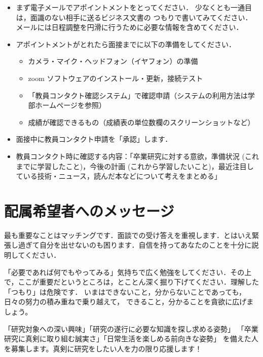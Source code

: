 \documentclass[uplatex,jis2004,a4paper,11pt]{jsarticle}
\begin{document}
\begin{itemize}
  \item まず電子メールでアポイントメントをとってください．
    少なくとも一通目は，面識のない相手に送るビジネス文書の
    つもりで書いてみてください．
    メールには日程調整を円滑に行うために必要な情報を含めてください．
  \item アポイントメントがとれたら面接までに以下の準備をしてください．
    \begin{itemize}
      \item カメラ・マイク・ヘッドフォン（イヤフォン）の準備
      \item zoom ソフトウェアのインストール・更新，接続テスト
      \item 「教員コンタクト確認システム」で確認申請（システムの利用方法は学部ホームページを参照）
      \item 成績が確認できるもの（成績表の単位数欄のスクリーンショットなど）
    \end{itemize}
  \item 面接中に教員コンタクト申請を「承認」します．
  \item 教員コンタクト時に確認する内容：「卒業研究に対する意欲，準備状況 (これまでに学習したこと)，今後の計画 (これから学習したいこと)，最近注目している技術・ニュース，読んだ本などについて考えをまとめる」
\end{itemize}

\section{配属希望者へのメッセージ}

最も重要なことはマッチングです．面談での受け答えを重視します．とはいえ緊張し過ぎて自分を出せないのも困ります．自信を持ってあなたのことを十分に説明してください．

「必要であれば何でもやってみる」気持ちで広く勉強をしてください．その上で，ここが重要だというところは，とことん深く掘り下げてください．理解した「つもり」は危険です．
いまはできないこと，分からないことであっても，日々の努力の積み重ねで乗り越えて，
できること，分かることを貪欲に広げましょう。

「研究対象への深い興味」「研究の遂行に必要な知識を探し求める姿勢」
「卒業研究に真剣に取り組む誠実さ」「日常生活を楽しめる前向きな姿勢」
を備えた人を募集します。真剣に研究をしたい人を力の限り応援します！

%
%
\end{document}
